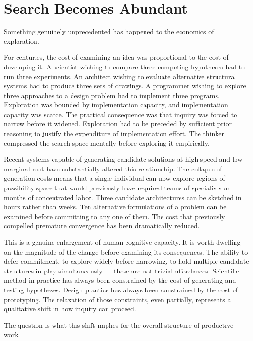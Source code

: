 
\section{Search Becomes Abundant}

Something genuinely unprecedented has happened to the economics of exploration.

For centuries, the cost of examining an idea was proportional to the cost of
developing it. A scientist wishing to compare three competing hypotheses had
to run three experiments. An architect wishing to evaluate alternative structural
systems had to produce three sets of drawings. A programmer wishing to explore
three approaches to a design problem had to implement three programs. Exploration
was bounded by implementation capacity, and implementation capacity was scarce.
The practical consequence was that inquiry was forced to narrow before it widened.
Exploration had to be preceded by sufficient prior reasoning to justify the
expenditure of implementation effort. The thinker compressed the search space
mentally before exploring it empirically.

Recent systems capable of generating candidate solutions at high speed and low
marginal cost have substantially altered this relationship. The collapse of
generation costs means that a single individual can now explore regions of
possibility space that would previously have required teams of specialists or
months of concentrated labor. Three candidate architectures can be sketched in
hours rather than weeks. Ten alternative formulations of a problem can be
examined before committing to any one of them. The cost that previously
compelled premature convergence has been dramatically reduced.

This is a genuine enlargement of human cognitive capacity. It is worth dwelling
on the magnitude of the change before examining its consequences. The ability
to defer commitment, to explore widely before narrowing, to hold multiple
candidate structures in play simultaneously --- these are not trivial affordances.
Scientific method in practice has always been constrained by the cost of
generating and testing hypotheses. Design practice has always been constrained
by the cost of prototyping. The relaxation of those constraints, even partially,
represents a qualitative shift in how inquiry can proceed.

The question is what this shift implies for the overall structure of productive work.

